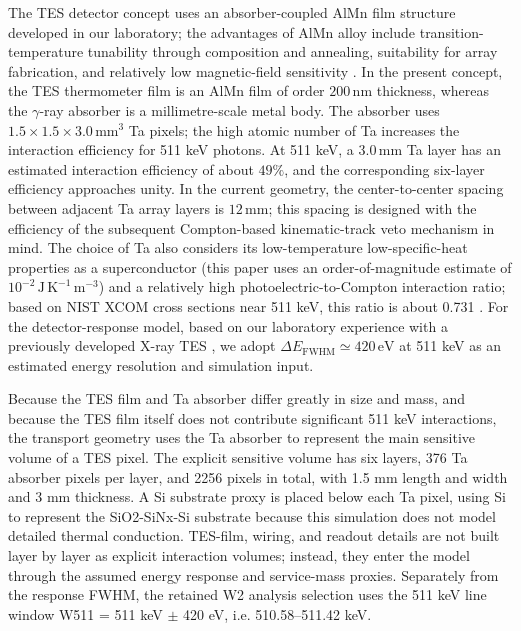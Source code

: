 \documentclass[11pt]{article}
\begin{document}
The TES detector concept uses an absorber-coupled AlMn film structure developed in our laboratory; the advantages of AlMn alloy include transition-temperature tunability through composition and annealing, suitability for array fabrication, and relatively low magnetic-field sensitivity \cite{Xie2026AlMn,Vavagiakis2017AlMnMagnetic}. In the present concept, the TES thermometer film is an AlMn film of order $200\,\mathrm{nm}$ thickness, whereas the $\gamma$-ray absorber is a millimetre-scale metal body. The absorber uses $1.5\times1.5\times3.0\,\mathrm{mm^3}$ Ta pixels; the high atomic number of Ta increases the interaction efficiency for 511 keV photons. At 511 keV, a $3.0\,\mathrm{mm}$ Ta layer has an estimated interaction efficiency of about $49\%$, and the corresponding six-layer efficiency approaches unity. In the current geometry, the center-to-center spacing between adjacent Ta array layers is $12\,\mathrm{mm}$; this spacing is designed with the efficiency of the subsequent Compton-based kinematic-track veto mechanism in mind. The choice of Ta also considers its low-temperature low-specific-heat properties as a superconductor (this paper uses an order-of-magnitude estimate of $10^{-2}\,\mathrm{J\,K^{-1}\,m^{-3}}$) and a relatively high photoelectric-to-Compton interaction ratio; based on NIST XCOM cross sections near 511 keV, this ratio is about 0.731 \cite{NISTXCOM}. For the detector-response model, based on our laboratory experience with a previously developed X-ray TES \cite{Xie2026AlMn}, we adopt $\Delta E_{\mathrm{FWHM}}\simeq420\,\mathrm{eV}$ at 511 keV as an estimated energy resolution and simulation input.

Because the TES film and Ta absorber differ greatly in size and mass, and because the TES film itself does not contribute significant 511 keV interactions, the transport geometry uses the Ta absorber to represent the main sensitive volume of a TES pixel. The explicit sensitive volume has six layers, 376 Ta absorber pixels per layer, and 2256 pixels in total, with 1.5 mm length and width and 3 mm thickness. A Si substrate proxy is placed below each Ta pixel, using Si to represent the SiO2-SiNx-Si substrate because this simulation does not model detailed thermal conduction. TES-film, wiring, and readout details are not built layer by layer as explicit interaction volumes; instead, they enter the model through the assumed energy response and service-mass proxies. Separately from the response FWHM, the retained W2 analysis selection uses the 511 keV line window W511 = 511 keV $\pm$ 420 eV, i.e. 510.58--511.42 keV.
\end{document}
